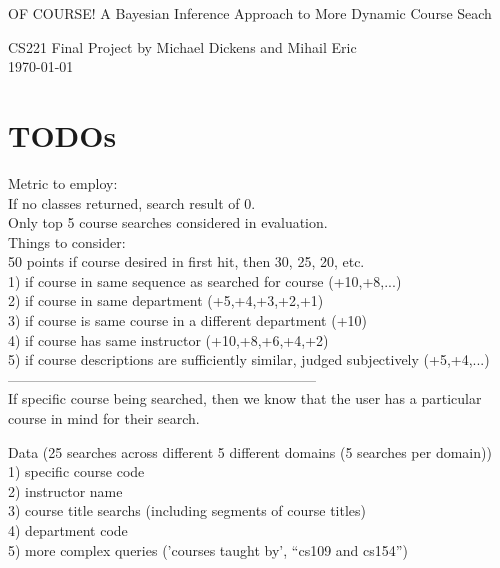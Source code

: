 \documentclass[12pt]{article}
\begin{document}
\begin{center}
{\Large OF COURSE! A Bayesian Inference Approach to More Dynamic Course Seach}
\begin{center}
{\normalsize CS221 Final Project by Michael Dickens and Mihail Eric}\\
\today 
\end{center}

\end{center}



\section*{TODOs}

%
Metric to employ: \\
If no classes returned, search result of 0.\\

Only top 5 course searches considered in evaluation.\\

Things to consider:\\
50 points if course desired in first hit, then 30, 25, 20, etc.\\
1) if course in same sequence as searched for course (+10,+8,...)\\
2) if course in same department (+5,+4,+3,+2,+1)\\
3) if course is same course in a different department (+10)\\
4) if course has same instructor (+10,+8,+6,+4,+2)\\
5) if course descriptions are sufficiently similar, judged subjectively (+5,+4,...)\\
------------------------------------------------------------------\\
If specific course being searched, then we know that the user has a particular course in mind for their search.

Data (25 searches across different 5 different domains (5 searches per domain))\\
1) specific course code\\
2) instructor name\\
3) course title searchs (including segments of course titles)\\
4) department code\\
5) more complex queries ('courses taught by', ``cs109 and cs154'')
\end{document}
